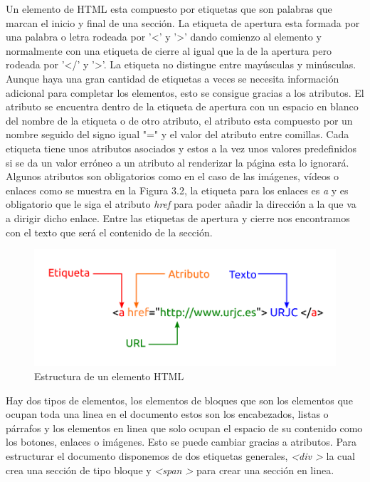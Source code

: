 Un elemento de HTML esta compuesto por etiquetas que son palabras que marcan el inicio y final de una sección. La etiqueta de apertura esta formada por una palabra o letra rodeada por '\textless' y '\textgreater' dando comienzo al elemento y normalmente con una etiqueta de cierre al igual que la de la apertura pero rodeada por '\textless/' y '\textgreater'. La etiqueta no distingue entre mayúsculas y minúsculas. Aunque haya una gran cantidad de etiquetas a veces se necesita información adicional para completar los elementos, esto se consigue gracias a los atributos. El atributo se encuentra dentro de la etiqueta de apertura con un espacio en blanco del nombre de la etiqueta o de otro atributo, el atributo esta compuesto por un nombre seguido del signo igual "=" y el valor del atributo entre comillas. Cada etiqueta tiene unos atributos asociados y estos a la vez unos valores predefinidos si se da un valor erróneo a un atributo al renderizar la página esta lo ignorará. Algunos atributos son obligatorios como en el caso de las imágenes, vídeos o enlaces como se muestra en la Figura 3.2, la etiqueta para los enlaces es \textit{a} y es obligatorio que le siga el atributo \textit{href}  para poder añadir la dirección a la que va a dirigir dicho enlace. Entre las etiquetas de apertura y cierre nos encontramos con el texto que será el contenido de la sección.\cite{etiqueta}


\begin{figure}[H]
    \centering
    \includegraphics[width=12cm, keepaspectratio]{img/elemento.png}
    \caption{Estructura de un elemento HTML}
    \label{fig:elemento}
\end{figure}

Hay dos tipos de elementos, los elementos de bloques que son los elementos que ocupan toda una linea en el documento estos son los encabezados, listas o párrafos y los elementos en linea que solo ocupan el espacio de su contenido como los botones, enlaces o imágenes. Esto se puede cambiar gracias a atributos. Para estructurar el documento disponemos de dos etiquetas generales, \textit{\textless div \textgreater} la cual crea una sección de tipo bloque y \textit{\textless span \textgreater} para crear una sección en linea.\cite{juan2}

